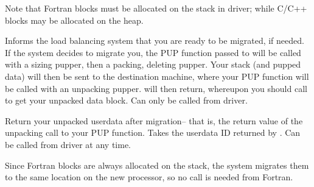 \documentclass[10pt]{article}
\begin{document}
     Note that Fortran blocks must be allocated on the stack in driver;
     while C/C++ blocks may be allocated on the heap.
\vspace{0.2in}

     Informs the load balancing system that you are ready to be
     migrated, if needed.  If the system decides to migrate you, the
     PUP function passed to  will be called with a sizing
     pupper, then a packing, deleting pupper.  Your stack (and pupped
     data) will then be sent to the destination machine, where your PUP
     function will be called with an unpacking pupper.  
     will then return, whereupon you should call  to
     get your unpacked data block.  Can only be called from driver.



     Return your unpacked userdata after migration-- that is, the
     return value of the unpacking call to your PUP function.  Takes
     the userdata ID returned by .  Can be called from
     driver at any time.

     Since Fortran blocks are always allocated on the stack, the system
     migrates them to the same location on the new processor, so no
      call is needed from Fortran.

\end{document}
